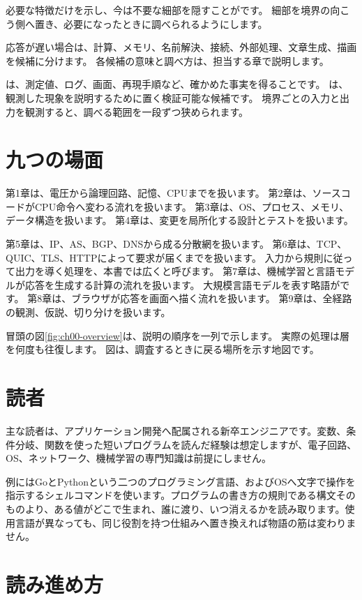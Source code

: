 必要な特徴だけを示し、今は不要な細部を隠すことがです。
細部を境界の向こう側へ置き、必要になったときに調べられるようにします。

応答が遅い場合は、計算、メモリ、名前解決、接続、外部処理、文章生成、描画を候補に分けます。
各候補の意味と調べ方は、担当する章で説明します。

は、測定値、ログ、画面、再現手順など、確かめた事実を得ることです。
は、観測した現象を説明するために置く検証可能な候補です。
境界ごとの入力と出力を観測すると、調べる範囲を一段ずつ狭められます。

\section{九つの場面}

第1章は、電圧から論理回路、記憶、CPUまでを扱います。
第2章は、ソースコードがCPU命令へ変わる流れを扱います。
第3章は、OS、プロセス、メモリ、データ構造を扱います。
第4章は、変更を局所化する設計とテストを扱います。

第5章は、IP、AS、BGP、DNSから成る分散網を扱います。
第6章は、TCP、QUIC、TLS、HTTPによって要求が届くまでを扱います。
入力から規則に従って出力を導く処理を、本書では広くと呼びます。
第7章は、機械学習と言語モデルが応答を生成する計算の流れを扱います。
大規模言語モデルを表す略語がです。
第8章は、ブラウザが応答を画面へ描く流れを扱います。
第9章は、全経路の観測、仮説、切り分けを扱います。

冒頭の図\ref{fig:ch00-overview}は、説明の順序を一列で示します。
実際の処理は層を何度も往復します。
図は、調査するときに戻る場所を示す地図です。

\section{読者}

主な読者は、アプリケーション開発へ配属される新卒エンジニアです。変数、条件分岐、関数を使った短いプログラムを読んだ経験は想定しますが、電子回路、OS、ネットワーク、機械学習の専門知識は前提にしません。

例にはGoとPythonという二つのプログラミング言語、およびOSへ文字で操作を指示するシェルコマンドを使います。プログラムの書き方の規則である構文そのものより、ある値がどこで生まれ、誰に渡り、いつ消えるかを読み取ります。使用言語が異なっても、同じ役割を持つ仕組みへ置き換えれば物語の筋は変わりません。

\section{読み進め方}

